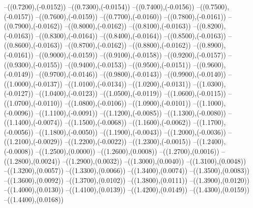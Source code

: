 {	--({\sx*(0.7200)},{\sy*(-0.0152)})
	--({\sx*(0.7300)},{\sy*(-0.0154)})
	--({\sx*(0.7400)},{\sy*(-0.0156)})
	--({\sx*(0.7500)},{\sy*(-0.0157)})
	--({\sx*(0.7600)},{\sy*(-0.0159)})
	--({\sx*(0.7700)},{\sy*(-0.0160)})
	--({\sx*(0.7800)},{\sy*(-0.0161)})
	--({\sx*(0.7900)},{\sy*(-0.0162)})
	--({\sx*(0.8000)},{\sy*(-0.0162)})
	--({\sx*(0.8100)},{\sy*(-0.0163)})
	--({\sx*(0.8200)},{\sy*(-0.0163)})
	--({\sx*(0.8300)},{\sy*(-0.0164)})
	--({\sx*(0.8400)},{\sy*(-0.0164)})
	--({\sx*(0.8500)},{\sy*(-0.0163)})
	--({\sx*(0.8600)},{\sy*(-0.0163)})
	--({\sx*(0.8700)},{\sy*(-0.0162)})
	--({\sx*(0.8800)},{\sy*(-0.0162)})
	--({\sx*(0.8900)},{\sy*(-0.0161)})
	--({\sx*(0.9000)},{\sy*(-0.0159)})
	--({\sx*(0.9100)},{\sy*(-0.0158)})
	--({\sx*(0.9200)},{\sy*(-0.0157)})
	--({\sx*(0.9300)},{\sy*(-0.0155)})
	--({\sx*(0.9400)},{\sy*(-0.0153)})
	--({\sx*(0.9500)},{\sy*(-0.0151)})
	--({\sx*(0.9600)},{\sy*(-0.0149)})
	--({\sx*(0.9700)},{\sy*(-0.0146)})
	--({\sx*(0.9800)},{\sy*(-0.0143)})
	--({\sx*(0.9900)},{\sy*(-0.0140)})
	--({\sx*(1.0000)},{\sy*(-0.0137)})
	--({\sx*(1.0100)},{\sy*(-0.0134)})
	--({\sx*(1.0200)},{\sy*(-0.0131)})
	--({\sx*(1.0300)},{\sy*(-0.0127)})
	--({\sx*(1.0400)},{\sy*(-0.0123)})
	--({\sx*(1.0500)},{\sy*(-0.0119)})
	--({\sx*(1.0600)},{\sy*(-0.0115)})
	--({\sx*(1.0700)},{\sy*(-0.0110)})
	--({\sx*(1.0800)},{\sy*(-0.0106)})
	--({\sx*(1.0900)},{\sy*(-0.0101)})
	--({\sx*(1.1000)},{\sy*(-0.0096)})
	--({\sx*(1.1100)},{\sy*(-0.0091)})
	--({\sx*(1.1200)},{\sy*(-0.0085)})
	--({\sx*(1.1300)},{\sy*(-0.0080)})
	--({\sx*(1.1400)},{\sy*(-0.0074)})
	--({\sx*(1.1500)},{\sy*(-0.0068)})
	--({\sx*(1.1600)},{\sy*(-0.0062)})
	--({\sx*(1.1700)},{\sy*(-0.0056)})
	--({\sx*(1.1800)},{\sy*(-0.0050)})
	--({\sx*(1.1900)},{\sy*(-0.0043)})
	--({\sx*(1.2000)},{\sy*(-0.0036)})
	--({\sx*(1.2100)},{\sy*(-0.0029)})
	--({\sx*(1.2200)},{\sy*(-0.0022)})
	--({\sx*(1.2300)},{\sy*(-0.0015)})
	--({\sx*(1.2400)},{\sy*(-0.0008)})
	--({\sx*(1.2500)},{\sy*(0.0000)})
	--({\sx*(1.2600)},{\sy*(0.0008)})
	--({\sx*(1.2700)},{\sy*(0.0016)})
	--({\sx*(1.2800)},{\sy*(0.0024)})
	--({\sx*(1.2900)},{\sy*(0.0032)})
	--({\sx*(1.3000)},{\sy*(0.0040)})
	--({\sx*(1.3100)},{\sy*(0.0048)})
	--({\sx*(1.3200)},{\sy*(0.0057)})
	--({\sx*(1.3300)},{\sy*(0.0066)})
	--({\sx*(1.3400)},{\sy*(0.0074)})
	--({\sx*(1.3500)},{\sy*(0.0083)})
	--({\sx*(1.3600)},{\sy*(0.0092)})
	--({\sx*(1.3700)},{\sy*(0.0102)})
	--({\sx*(1.3800)},{\sy*(0.0111)})
	--({\sx*(1.3900)},{\sy*(0.0120)})
	--({\sx*(1.4000)},{\sy*(0.0130)})
	--({\sx*(1.4100)},{\sy*(0.0139)})
	--({\sx*(1.4200)},{\sy*(0.0149)})
	--({\sx*(1.4300)},{\sy*(0.0159)})
	--({\sx*(1.4400)},{\sy*(0.0168)})
}
